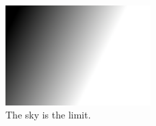 \documentclass[11pt,spanish]{article}
\begin{document}
\begin{figure}[!h]
\centering
\includegraphics[width=0.5\textwidth]{sky.jpg}
\caption{The sky is the limit.}
\end{figure}
\end{document}
